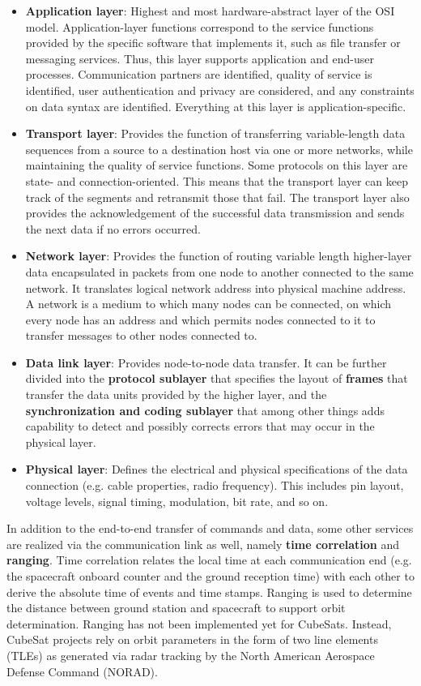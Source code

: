 \begin{itemize}
\item \textbf{Application layer}: Highest and most hardware-abstract layer of the OSI model. Application-layer functions correspond to the service functions provided by the specific software that implements it, such as file transfer or messaging services. Thus, this layer supports application and end-user processes. Communication partners are identified, quality of service is identified, user authentication and privacy are considered, and any constraints on data syntax are identified. Everything at this layer is application-specific.
\item \textbf{Transport layer}: Provides the function of transferring variable-length data sequences from a source to a destination host via one or more networks, while maintaining the quality of service functions. Some protocols on this layer are state- and connection-oriented. This means that the transport layer can keep track of the segments and retransmit those that fail. The transport layer also provides the acknowledgement of the successful data transmission and sends the next data if no errors occurred. 
\item \textbf{Network layer}: Provides the function of routing variable length higher-layer data encapsulated in packets from one node to another connected to the same network. It translates logical network address into physical machine address. A network is a medium to which many nodes can be connected, on which every node has an address and which permits nodes connected to it to transfer messages to other nodes connected to.
\item \textbf{Data link layer}: Provides node-to-node data transfer. It can be further divided into the \textbf{protocol sublayer} that specifies the layout of \textbf{frames} that transfer the data units provided by the higher layer, and the \textbf{synchronization and coding sublayer} that among other things adds capability to detect and possibly corrects errors that may occur in the physical layer.
\item \textbf{Physical layer}: Defines the electrical and physical specifications of the data connection (e.g. cable properties, radio frequency). This includes pin layout, voltage levels, signal timing, modulation, bit rate, and so on. 
\end{itemize}

In addition to the end-to-end transfer of commands and data, some other services are realized via the communication link as well, namely \textbf{time correlation} and \textbf{ranging}. Time correlation relates the local time at each communication end (e.g. the spacecraft onboard counter and the ground reception time) with each other to derive the absolute time of events and time stamps. Ranging is used to determine the distance between ground station and spacecraft to support orbit determination. Ranging has not been implemented yet for CubeSats. Instead, CubeSat projects rely on orbit parameters in the form of two line elements (TLEs) as generated via radar tracking by the North American Aerospace Defense Command (NORAD).

